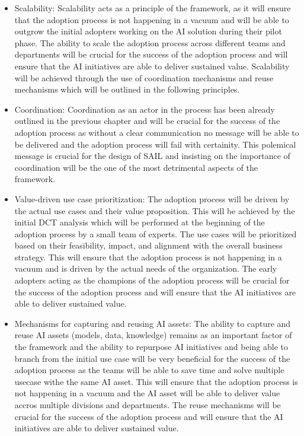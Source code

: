 \documentclass[]{imc-inf}
\def\tightlist{}
\begin{document}
\begin{itemize}
	\tightlist
	\item
	Scalability: Scalability acts as a principle of the framework, as it
	will ensure that the adoption process is not happening in a vacuum and
	will be able to outgrow the initial adopters working on the AI
	solution during their pilot phase. The ability to scale the adoption
	process across different teams and departments will be crucial for the
	success of the adoption process and will ensure that the AI
	initiatives are able to deliver sustained value. Scalability will be
	achieved through the use of coordination mechanisms and reuse
	mechanisms which will be outlined in the following principles.
	\item
	Coordination: Coordination as an actor in the process has been already
	outlined in the previous chapter and will be crucial for the success
	of the adoption process as without a clear communication no message
	will be able to be delivered and the adoption process will fail with
	certainity. This polemical message is crucial for the design of SAIL
	and insisting on the importance of coordination will be the one of the
	most detrimental aspects of the framework.
	\item
	Value-driven use case prioritization: The adoption process will be
	driven by the actual use cases and their value proposition. This will
	be achieved by the initial DCT analysis which will be performed at the
	beginning of the adoption process by a small team of experts. The use
	cases will be prioritized based on their feasibility, impact, and
	alignment with the overall business strategy. This will ensure that
	the adoption process is not happening in a vacuum and is driven by the
	actual needs of the organization. The early adopters acting as the
	champions of the adoption process will be crucial for the success of
	the adoption process and will ensure that the AI initiatives are able
	to deliver sustained value.
	\item
	Mechanisms for capturing and reusing AI assets: The ability to capture
	and reuse AI assets (models, data, knowledge) remains as an important
	factor of the framework and the ability to repurpose AI initiatives
	and being able to branch from the initial use case will be very
	beneficial for the success of the adoption process as the teams will
	be able to save time and solve multiple usecase withe the same AI
	asset. This will ensure that the adoption process is not happening in
	a vacuum and the AI asset will be able to deliver value accros
	multiple divisions and departments. The reuse mechanisms will be
	crucial for the success of the adoption process and will ensure that
	the AI initiatives are able to deliver sustained value.
\end{itemize}
\end{document}
